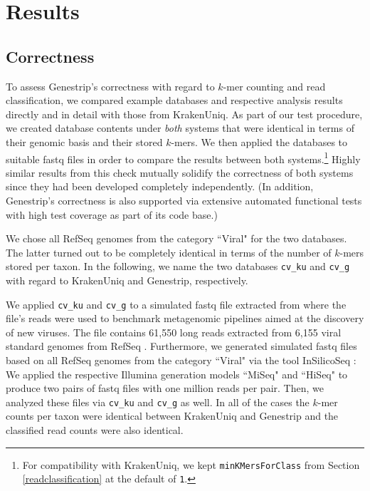 \documentclass[pdflatex,sn-vancouver-num]{sn-jnl}
\begin{document}
    \section{Results}\label{results}

    \subsection{Correctness}
    \label{correctness}

    To assess Genestrip's correctness with regard to $k$-mer counting and read classification, we compared example databases and respective analysis results directly and in detail with those from KrakenUniq. 
    As part of our test procedure, we created database contents under \emph{both} systems that were identical in terms of their genomic basis and their stored $k$-mers.
    We then applied the databases to suitable fastq files in order to compare the results between both systems.\footnote{For compatibility with KrakenUniq, we kept \texttt{minKMersForClass} from Section \ref{readclassification} at the default of \texttt{1}.} Highly similar results from this check mutually solidify the correctness of both systems since they had been developed completely independently. (In addition, Genestrip's correctness is also supported via extensive automated functional tests with high test coverage as part of its code base.)

    We chose all RefSeq genomes from the category ``Viral" for the two databases. The latter turned out to be completely identical in terms of the number of $k$-mers stored per taxon. In the following, we name the two databases \texttt{cv\_ku} and \texttt{cv\_g} with regard to KrakenUniq and Genestrip, respectively.

    We applied \texttt{cv\_ku} and \texttt{cv\_g} to a simulated fastq file extracted from \cite{Wu:2024aa} where the file's reads were used to benchmark metagenomic pipelines aimed at the discovery of new viruses.
The file contains 61,550 long reads extracted from 6,155 viral standard genomes from RefSeq \citep{Wu:2024aa}. 
Furthermore, we generated simulated fastq files based on all RefSeq genomes from the category ``Viral" via the tool InSilicoSeq \citep{10.1093/bioinformatics/bty630}: We applied the respective Illumina generation models ``MiSeq" and ``HiSeq" to produce two pairs of fastq files with one million reads per pair. Then, we analyzed these files via \texttt{cv\_ku} and \texttt{cv\_g} as well.
In all of the cases the $k$-mer counts per taxon were identical between KrakenUniq and Genestrip and the classified read counts were also identical.
     
\end{document}

